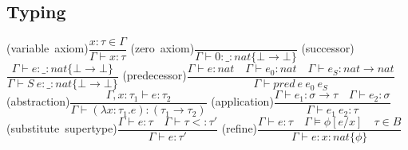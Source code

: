 \documentclass[12pt,a4paper,titlepage]{article}
\newcommand{\ts}{\vdash}
\newcommand{\dts}{\vDash}
\newcommand{\tj}[3]{\mbox{(#1)$\dfrac{#2}{#3}$}\quad}
\begin{document}
    \begin{spacing}{2.5}
        \subsection{Typing}
        \begin{center}
            \tj{variable axiom}{
                x:\tau \in \Gamma
            }{
                \Gamma \ts x:\tau
            }
            \tj{zero axiom}{}{
                \Gamma \ts 0:\_:nat\{\bot \rightarrow \bot\}
            }
            \tj{successor}{
                \Gamma \ts e:\_:nat\{\bot \rightarrow \bot\}
            }{
                \Gamma \ts S\ e:\_:nat\{\bot \rightarrow \bot\}
            }
            \tj{predecessor}{
                \Gamma \ts e:nat \quad \Gamma \ts e_0:nat \quad \Gamma \ts e_S:nat \rightarrow nat
            }{
                \Gamma \ts pred\ e\ e_0\ e_S
            }
            \tj{abstraction}{
                \Gamma , x : \tau_1 \ts e:\tau_2
            }{
                \Gamma \ts (\lambda x:\tau_1 . e) : (\tau_1 \rightarrow \tau_2)
            }
            \tj{application}{
                \Gamma \ts e_1 : \sigma \rightarrow \tau \quad \Gamma \ts e_2 : \sigma
            }{
                \Gamma \ts e_1\ e_2 : \tau
            }
            \tj{substitute supertype}{
                \Gamma \ts e : \tau \quad \Gamma \ts \tau <: \tau'
            }{
                \Gamma \ts e : \tau'
            }
            \tj{refine}{
                \Gamma \ts e : \tau \quad \Gamma \dts \phi [ e / x ] \quad \tau \in B
            }{
                \Gamma \ts e : x : nat \{\phi\}
            }
        \end{center}

\end{spacing}
\end{document}
